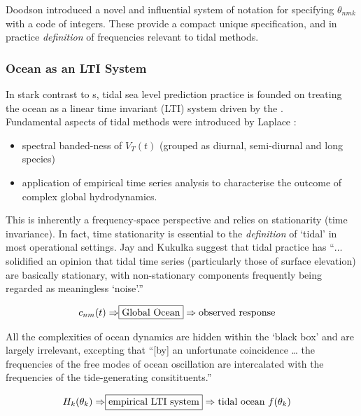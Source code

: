 Doodson \citep{Doodson:1921kt} introduced a novel and influential system of notation for specifying $\theta_{nmk}$ with a code of integers.  These provide a compact unique specification, and in practice \emph{definition} of frequencies relevant to tidal methods.


\subsubsection{Ocean as an LTI System}
\label{S:LTI}
In stark contrast to \OGCM{}s, tidal sea level prediction practice is founded on treating the ocean as a linear time invariant (LTI) system \citep{Chatfield:2004uv} driven by the \ATGP{}.\\

Fundamental aspects of tidal methods were introduced by Laplace \cite[chpt 7]{Cartwright:2000tt}:
\begin{itemize}
\item spectral banded-ness of $V_T(t)$ (grouped as diurnal, semi-diurnal and long species) 
\item application of empirical time series analysis to characterise the outcome of complex global hydrodynamics. 
\end{itemize}

This is inherently a frequency-space perspective and relies on stationarity (time invariance). 
In fact, time stationarity is essential to the \emph{definition} of `tidal' in most operational settings.
Jay and Kukulka \citep{Jay:2003bj} suggest that tidal practice has ``$\dots$
solidified an opinion that tidal time series (particularly those of surface elevation) are basically stationary, with non-stationary components frequently being regarded as meaningless `noise'.''


\begin{align}
    c_{nm}(t)       \Rightarrow & \fbox{Global Ocean} \Rightarrow \mbox{observed response}                \nonumber 
\end{align}


All the complexities of ocean dynamics are hidden within the `black box' and are largely irrelevant, excepting that ``[by] an unfortunate coincidence \dots{} the frequencies of the free modes of ocean oscillation are intercalated with the frequencies of the tide-generating consitituents.\citep{Groves:1975ky}''



\begin{align}
\label{E:LTI}
H_{k}(\theta_k) \Rightarrow & \fbox{empirical LTI system} \Rightarrow \mbox{tidal ocean $f(\theta_k)$}  %
\end{align}


